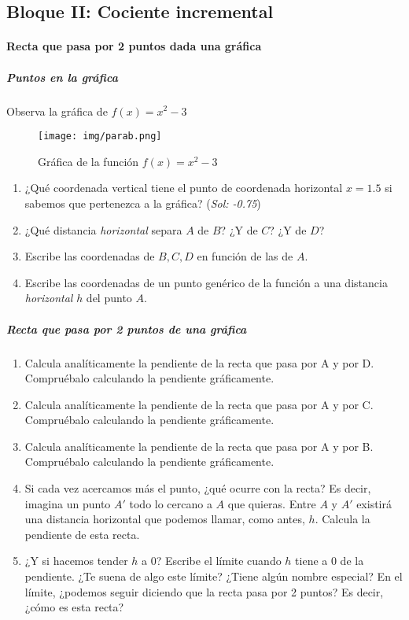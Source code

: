 \documentclass[palatino,nobuilddate,nochap]{apuntesURJC}
\begin{document}
\newpage
\subsection{Bloque II: Cociente incremental}

\paragraph{Recta que pasa por 2 puntos dada una gráfica}

\subparagraph{Puntos en la gráfica}
Observa la gráfica de $f(x)=x^2-3$
\begin{figure}[h]
\centering
\texttt{[image: img/parab.png]}
\caption{Gráfica de la función $f(x) = x^2-3$}
\label{GraficaXcuad}
\end{figure}

\begin{enumerate}
	\item ¿Qué coordenada vertical tiene el punto de coordenada horizontal $x=1.5$ si sabemos que pertenezca a la gráfica? (\textit{Sol: -0.75})
	\item ¿Qué distancia \textit{horizontal} separa $A$ de $B$? ¿Y de $C$? ¿Y de $D$?
	\item Escribe las coordenadas de $B,C,D$ en función de las de $A$.
	\item Escribe las coordenadas de un punto genérico de la función a una distancia \textit{horizontal} $h$ del punto $A$. 
\end{enumerate}


\subparagraph{Recta que pasa por 2 puntos de una gráfica}
\begin{enumerate}
	\item Calcula analíticamente la pendiente de la recta que pasa por A y por D. Compruébalo calculando la pendiente gráficamente.
	\item Calcula analíticamente la pendiente de la recta que pasa por A y por C. Compruébalo calculando la pendiente gráficamente.
	\item Calcula analíticamente la pendiente de la recta que pasa por A y por B. Compruébalo calculando la pendiente gráficamente.
	\item Si cada vez acercamos más el punto, ¿qué ocurre con la recta? Es decir, imagina un punto $A'$ todo lo cercano a $A$ que quieras. 
	Entre $A$ y $A'$ existirá una distancia horizontal que podemos llamar, como antes, $h$. Calcula la pendiente de esta recta.
	\item ¿Y si hacemos tender $h$ a 0? Escribe el límite cuando $h$ tiene a 0 de la pendiente. ¿Te suena de algo este límite? ¿Tiene algún nombre especial? 
	\subitem En el límite, ¿podemos seguir diciendo que la recta pasa por 2 puntos? Es decir, ¿cómo es esta recta? 
\end{enumerate}
\end{document}
